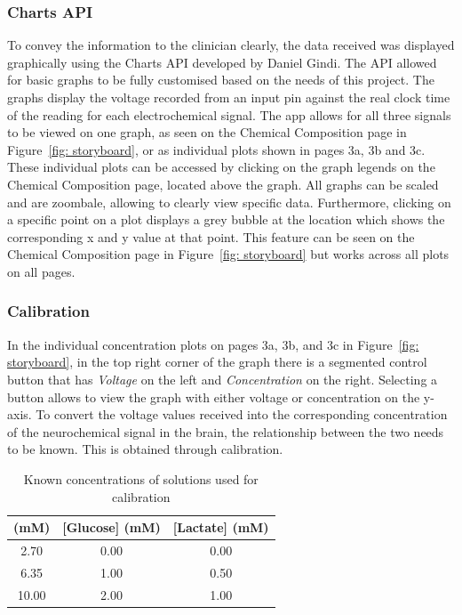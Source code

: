 \subsubsection{Charts API}
To convey the information to the clinician clearly, the data received was displayed graphically using the Charts API developed by Daniel Gindi. The API allowed for basic graphs to be fully customised based on the needs of this project. The graphs display the voltage recorded from an input pin against the real clock time of the reading for each electrochemical signal. The app allows for all three signals to be viewed on one graph, as seen on the Chemical Composition page in Figure~\ref{fig: storyboard}, or as individual plots shown in pages 3a, 3b and 3c. These individual plots can be accessed by clicking on the graph legends on the Chemical Composition page, located above the graph. All graphs can be scaled and are zoombale, allowing to clearly view specific data. Furthermore, clicking on a specific point on a plot displays a grey bubble at the location which shows the corresponding x and y value at that point. This feature can be seen on the Chemical Composition page in Figure~\ref{fig: storyboard} but works across all plots on all pages.


\subsubsection{Calibration}
In the individual concentration plots on pages 3a, 3b, and 3c in Figure~\ref{fig: storyboard}, in the top right corner of the graph there is a segmented control button that has \textit{Voltage} on the left and \textit{Concentration} on the right. Selecting a button allows to view the graph with either voltage or concentration on the y-axis. To convert the voltage values received into the corresponding concentration of the neurochemical signal in the brain, the relationship between the two needs to be known. This is obtained through calibration. 

\begin{table}[h!]
\centering
\begin{tabular}{||c c c||} 
 \hline
 [K+] (mM) & [Glucose] (mM) & [Lactate] (mM) \\ [0.5ex] 
 \hline\hline
 2.70 & 0.00 & 0.00 \\
 6.35 & 1.00 & 0.50 \\
 10.00 & 2.00 & 1.00 \\
 \hline
\end{tabular}
\caption{Known concentrations of solutions used for calibration}
\label{table: calibration conc}
\end{table}

